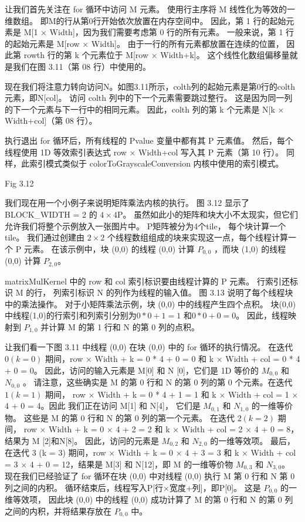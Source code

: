 让我们首先关注在 for 循环中访问 M 元素。 使用行主序将 M 线性化为等效的一维数组。 
即M的行从第0行开始依次放置在内存空间中。 因此，第 1 行的起始元素是 M[1 × Width]，因为我们需要考虑第 0 行的所有元素。
一般来说，第 1 行的起始元素是 M[row × Width]。 由于一行的所有元素都放置在连续的位置，
因此第 rowth 行的第 k 个元素位于 M[row × Width+k]。 这个线性化数组偏移量就是我们在图 3.11（第 08 行）中使用的。

现在我们将注意力转向访问N。如图3.11所示，colth列的起始元素是第0行的colth元素，即N[col]。 
访问 colth 列中的下一个元素需要跳过整行。 这是因为同一列的下一个元素与下一行中的相同元素。 
因此，colth 列的第 k 个元素是 N[k × Width+col]（第 08 行）。

执行退出 for 循环后，所有线程的 Pvalue 变量中都有其 P 元素值。 
然后，每个线程使用 1D 等效索引表达式 row × Width+col 写入其 P 元素（第 10 行）。 
同样，此索引模式类似于 colorToGrayscaleConversion 内核中使用的索引模式。

{\color{red} Fig 3.12}

我们现在用一个小例子来说明矩阵乘法内核的执行。 图 3.12 显示了 BLOCK\_WIDTH = 2 的 $4\times 4$P。
虽然如此小的矩阵和块大小不太现实，但它们允许我们将整个示例放入一张图片中。 P矩阵被分为4个tile，
每个块计算一个tile。 我们通过创建由 $2\times 2$ 个线程数组组成的块来实现这一点，每个线程计算一个 P 元素。 
在该示例中，块 (0,0) 的线程 (0,0) 计算 $P_{0,0}$ ，而块 (1,0) 的线程 (0,0) 计算 $P_{2,0}$。

matrixMulKernel 中的 row 和 col 索引标识要由线程计算的 P 元素。 行索引还标识 M 的行，
列索引标识 N 的列作为线程的输入值。 图 3.13 说明了每个线程块中的乘法操作。 
对于小矩阵乘法示例，块 (0,0) 中的线程产生四个点积。 块(0,0)中线程(1,0)的行索引和列索引分别为$0*0 + 1 = 1$
和$0 * 0 + 0 = 0$。 因此，线程映射到 $P_{1,0}$ 并计算 M 的第 1 行和 N 的第 0 列的点积。

让我们看一下图 3.11 中线程 (0,0) 在块 (0,0) 中的 for 循环的执行情况。 
在迭代 $0(k = 0)$ 期间，row × Width + k = 0 * 4 + 0 = 0 和 k × Width + col = 0 * 4 + 0 = 0。
因此，访问的输入元素是 M[0] 和 N [0]，它们是 1D 等价的 $M_{0,0}$ 和 $N_{0,0}$ 。 
请注意，这些确实是 M 的第 0 行和 N 的第 0 列的第 0 个元素。在迭代 $1(k = 1)$ 期间，
row × Width + k = 0 * 4 + 1 = 1 和 k × Width + col = 1 × 4 + 0 = 4。因此 我们正在访问 M[1] 和 N[4]，
它们是 $M_{0,1}$ 和 $N_{1,0}$ 的一维等价物。 这些是 M 的第 0 行和 N 的第 0 列的第一个元素。
在迭代 $2(k = 2)$ 期间， row × Width + k = 0 × 4 + 2 = 2 和 k × Width + col = 2 × 4 + 0 = 8，
结果为 M [2]和N[8]。 因此，访问的元素是 $M_{0,2}$ 和 $N_{2,0}$ 的一维等效项。
最后，在迭代 3 (k = 3) 期间，row × Width + k = 0 × 4 + 3 = 3 
和 k × Width + col = 3 × 4 + 0 = 12，结果是 M[3] 和 N[12]，即 M 的一维等价物 $M_{0,3}$ 和 $N_{3,0}$。 
现在我们已经验证了 for 循环在块 (0,0) 中对线程 (0,0) 执行 M 第 0 行和 N 第 0 列之间的内积。 
循环结束后，线程写入P[行×宽度+列]，即P[0]。 这是 $P_{0,0}$ 的一维等效项，
因此块 (0,0) 中的线程 (0,0) 成功计算了 M 的第 0 行和 N 的第 0 列之间的内积，并将结果存放在 $P_{0,0}$ 中。

